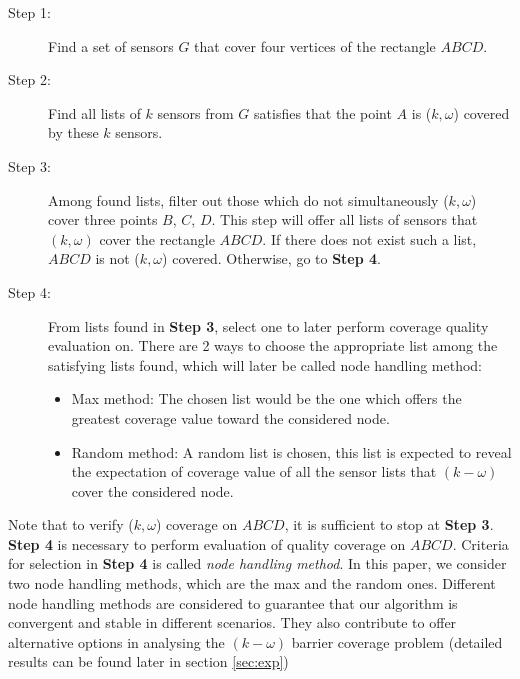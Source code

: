 \begin{description}
	\item[Step 1:] Find a set of sensors $G$ that cover four vertices of the rectangle $ ABCD $.
	\item[Step 2:] Find all lists of $k$ sensors from $G$ satisfies that the point $A$ is ($k,\omega$) covered by these $k$ sensors.
	\item[Step 3:] Among found lists, filter out those which do not simultaneously ($k,\omega$) cover three points $B$, $C$, $D$. This step will offer all lists of sensors that $(k,\omega)$ cover the rectangle $ABCD$. If there does not exist such a list, $ABCD$ is not ($k,\omega$) covered. Otherwise, go to {\bfseries Step 4}.
	\item[Step 4:] From lists found in {\bfseries Step 3}, select one to later perform coverage quality evaluation on. There are 2 ways to choose the appropriate list among the satisfying lists found, which will later be called node handling method:
	\begin{itemize}
		\item Max method: The chosen list would be the one which offers the greatest coverage value toward the considered node.
		\item Random method: A random list is chosen, this list is expected to reveal the expectation of coverage value of all the sensor lists that $(k-\omega)$ cover the considered node.
	\end{itemize}
\end{description}
\par Note that to verify ($k,\omega$) coverage on $ABCD$, it is sufficient to stop at {\bfseries Step 3}. {\bfseries Step 4} is necessary to perform evaluation of quality coverage on $ABCD$. Criteria for selection in {\bfseries Step 4} is called {\itshape node handling method}. In this paper, we consider two node handling methods, which are the max and the random ones. Different node handling methods are considered to guarantee that our algorithm is convergent and stable in different scenarios. They also contribute to offer alternative options in analysing the $(k-\omega)$ barrier coverage problem (detailed results can be found later in section \ref{sec:exp})\par

